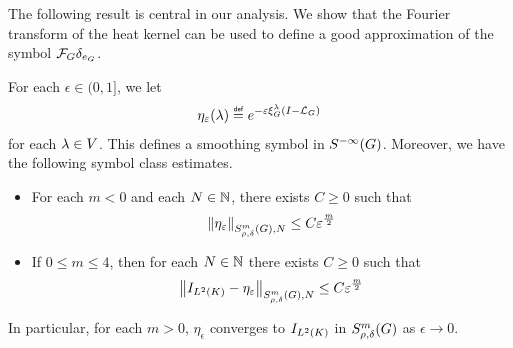 The following result is central in our analysis.
We show that the Fourier transform of the heat kernel can be used to define a good approximation of the symbol $\Fourier \delta_{e_\Group}$.

\begin{theorem}
\label{theorem:generalized_Littlewood-Paley_decomposition}
    For each $\epsilon \in (0, 1]$,
    we let
    \begin{align*}
        \eta_\epsilon(\lambda) \defeq \e^{-\epsilon \Rep \lambda \BesselPotentialSquared {}}
    \end{align*}
    for each $\lambda \in \VectorSpace$.
    This defines a smoothing symbol in $\SmoothingSymbols$.
    Moreover, we have the following symbol class estimates.
    \begin{itemize}
        \item
            For each $m < 0$ and each $N \in \N$,
            there exists $C \geq 0$ such that
            \begin{align*}
                \SymbolSemiNorm m {\rho, \delta} N {\eta_\epsilon} \leq C \epsilon^\frac m 2
            \end{align*}
        \item
            If $0 \leq m \leq 4$,
            then for each $N \in \N$
            there exists $C \geq 0$ such that
            \begin{align*}
                \SymbolSemiNorm m {\rho, \delta} N {\Id {\Lebesgue 2 \CompactGroup} - \eta_\epsilon} \leq C \epsilon^\frac m 2
            \end{align*}
    \end{itemize}

    In particular, for each $m > 0$, $\eta_\epsilon$ converges to $\Id {\Lebesgue 2 \CompactGroup}$ in $\SymbolClass m {\rho, \delta}$ as $\epsilon \to 0$.
\end{theorem}
